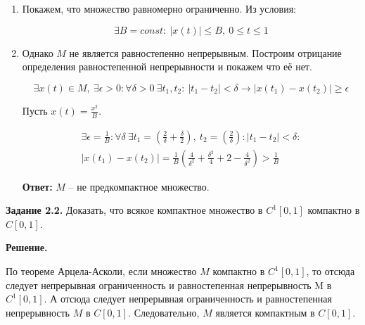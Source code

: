 \documentclass[12pt, a4paper]{article}
\begin{document}
\begin{enumerate}
  \item Покажем, что множество равномерно ограниченно. Из условия:
  
  \[\exists B = const:\ |x(t)| \le B,\ 0 \le t \le 1 \]

  \item Однако $M$ не является равностепенно непрерывным. Построим отрицание
  определения равностепенной непрерывности и покажем что её нет.

  \[ \exists x(t) \in M,\ \exists \epsilon > 0: \forall \delta > 0\ \exists 
  t_1, t_2:\ |t_1 - t_2| < \delta \rightarrow |x(t_1) - x(t_2)| \ge \epsilon \]
  
  Пусть $x(t) = \frac{x^2}{B}$.


   \begin{multline*} 
    \exists \epsilon = \frac{1}{B}: \forall \delta\ \exists t_1 = 
   \left( \frac{2}{\delta} + \frac{\delta}{2} \right),\ t_2 = \left( \frac{2}{\delta} \right): 
   |t_1 - t_2| < \delta:
   \\ |x(t_1) - x(t_2)| = \frac{1}{B} \left( \frac{4}{\delta^2} + \frac{\delta^2}{4} + 2 - \frac{4}{\delta^2} 
   \right) > \frac{1}{B}
   \end{multline*}

   \textbf{Ответ:} $M$ -- не предкомпактное множество. 

\end{enumerate}

\textbf{Задание 2.2.} Доказать, что всякое компактное множество в $C^1[0, 1]$
компактно в $C[0, 1]$.

\textbf{Решение.}

По теореме Арцела-Асколи, если множество $M$ компактно в $C^1[0, 1]$, то отсюда
следует непрерывная ограниченность и равностепенная непрерывность M в $C^1[0, 1]$.
А отсюда следует непрерывная ограниченность и равностепенная непрерывность $M$ в
$C[0, 1]$. Следовательно, $M$ является компактным в $C[0, 1]$. 
\end{document}
